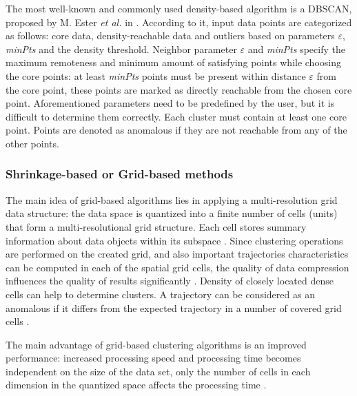 The most well-known and commonly used density-based algorithm is a DBSCAN, proposed by M. Ester \textit{et al.} in \cite{inproceedings:20_dbscan}. According to it, input data points are categorized as follows: core data, density-reachable data and outliers based on parameters $\varepsilon$, \textit{minPts} and the density threshold. Neighbor parameter $\varepsilon$ and \textit{minPts} specify the maximum remoteness and minimum amount of satisfying points while choosing the core points: at least \textit{minPts} points must be present within distance $\varepsilon$ from the core point, these points are marked as directly reachable from the chosen core point. Aforementioned parameters need to be predefined by the user, but it is difficult to determine them correctly. Each cluster must contain at least one core point. Points are denoted as anomalous if they are not reachable from any of the other points.

\subsubsection{Shrinkage-based or Grid-based methods}
The main idea of grid-based algorithms lies in applying a multi-resolution grid data structure: the data space is quantized into a finite number of cells (units) that form a multi-resolutional grid structure. Each cell stores summary information about data objects within its subspace \cite{article:22_survey_dscc}. Since clustering operations are performed on the created grid, and also important trajectories characteristics can be computed in each of the spatial grid cells, the quality of data compression influences the quality of results significantly \cite{article:1_survey_stdm}. Density of closely located dense cells can help to determine clusters. A trajectory can be considered as an anomalous if it differs from the expected trajectory in a number of covered grid cells \cite{article:22_survey_dscc}.

The main advantage of grid-based clustering algorithms is an improved performance: increased processing speed and processing time becomes independent on the size of the data set, only the number of cells in each dimension in the quantized space affects the processing time \cite{article:8_review_mot_cl_alg}.

